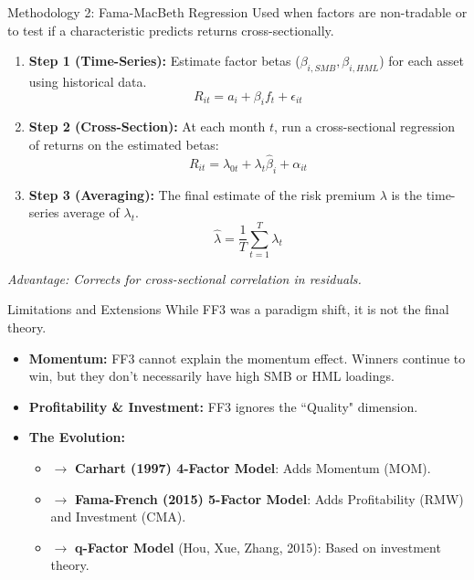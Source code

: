 \documentclass{beamer}
\begin{document}
\begin{frame}{Methodology 2: Fama-MacBeth Regression}
	Used when factors are non-tradable or to test if a characteristic predicts returns cross-sectionally.
	
	\begin{enumerate}
		\item \textbf{Step 1 (Time-Series):} Estimate factor betas ($\beta_{i,SMB}, \beta_{i,HML}$) for each asset using historical data.
		$$ R_{it} = a_i + \beta_i f_t + \epsilon_{it} $$
		\item \textbf{Step 2 (Cross-Section):} At each month $t$, run a cross-sectional regression of returns on the estimated betas:
		$$ R_{it} = \lambda_{0t} + \lambda_{t} \hat{\beta}_{i} + \alpha_{it} $$
		\item \textbf{Step 3 (Averaging):} The final estimate of the risk premium $\lambda$ is the time-series average of $\lambda_t$.
		$$ \hat{\lambda} = \frac{1}{T} \sum_{t=1}^{T} \lambda_t $$
	\end{enumerate}
	\textit{Advantage: Corrects for cross-sectional correlation in residuals.}
\end{frame}

\begin{frame}{Limitations and Extensions}
	While FF3 was a paradigm shift, it is not the final theory.
	
	\begin{itemize}
		\item \textbf{Momentum:} FF3 cannot explain the momentum effect. Winners continue to win, but they don't necessarily have high SMB or HML loadings.
		\item \textbf{Profitability \& Investment:} FF3 ignores the ``Quality" dimension.
		\item \textbf{The Evolution:}
		\begin{itemize}
			\item $\rightarrow$ \textbf{Carhart (1997) 4-Factor Model}: Adds Momentum (MOM).
			\item $\rightarrow$ \textbf{Fama-French (2015) 5-Factor Model}: Adds Profitability (RMW) and Investment (CMA).
			\item $\rightarrow$ \textbf{q-Factor Model} (Hou, Xue, Zhang, 2015): Based on investment theory.
		\end{itemize}
	\end{itemize}
\end{frame}
\end{document}
